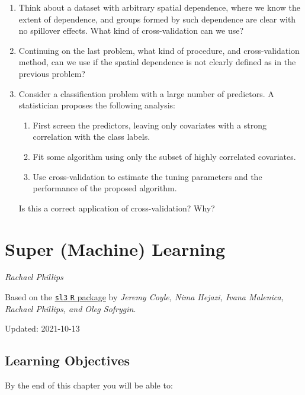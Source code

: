 \documentclass[
  12pt, krantz2,
]{krantz}
\newcommand{\passthrough}[1]{#1}
\providecommand{\tightlist}{%
  \setlength{\itemsep}{0pt}\setlength{\parskip}{0pt}}
\theoremstyle{definition}
\theoremstyle{definition}
\theoremstyle{definition}
\newcommand{\1}{\mathbbm{1}}
\begin{document}
\begin{enumerate}
\def\labelenumi{\arabic{enumi}.}
\item
  Think about a dataset with arbitrary spatial dependence, where we know
  the extent of dependence, and groups formed by such dependence are clear
  with no spillover effects. What kind of cross-validation can we use?
\item
  Continuing on the last problem, what kind of procedure, and cross-validation
  method, can we use if the spatial dependence is not clearly defined as in the
  previous problem?
\item
  Consider a classification problem with a large number of predictors. A
  statistician proposes the following analysis:

  \begin{enumerate}
  \def\labelenumii{\alph{enumii}.}
  \tightlist
  \item
    First screen the predictors, leaving only covariates with a strong
    correlation with the class labels.
  \item
    Fit some algorithm using only the subset of highly correlated covariates.
  \item
    Use cross-validation to estimate the tuning parameters and the performance
    of the proposed algorithm.
  \end{enumerate}

  Is this a correct application of cross-validation? Why?
\end{enumerate}

\hypertarget{sl3}{%
\chapter{Super (Machine) Learning}\label{sl3}}

\emph{Rachael Phillips}

Based on the \href{https://github.com/tlverse/sl3}{\passthrough{\lstinline!sl3!} \passthrough{\lstinline!R!} package} by \emph{Jeremy
Coyle, Nima Hejazi, Ivana Malenica, Rachael Phillips, and Oleg Sofrygin}.

Updated: 2021-10-13

\hypertarget{learning-objectives}{%
\section*{Learning Objectives}\label{learning-objectives}}


By the end of this chapter you will be able to:
\end{document}
